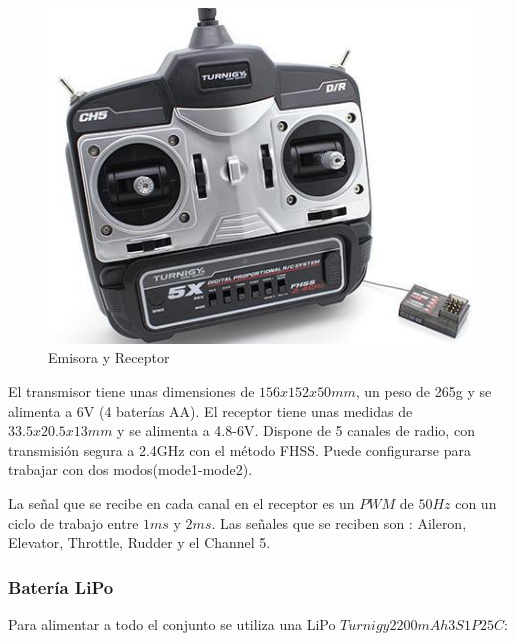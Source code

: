 \documentclass[twoside,11pt]{book}
\begin{document}
\begin{figure}[h!]
\begin{center}
\includegraphics[scale=0.4,bb=0 0 400 354]{images/E_R.png} 
\caption{Emisora y Receptor}
\end{center}
\end{figure}

El transmisor tiene unas dimensiones de $156x152x50mm$, un peso de 265g y se alimenta a 6V (4 baterías AA). El receptor tiene unas medidas de $33.5x20.5x13mm$ y se alimenta a 4.8-6V. Dispone de 5 canales de radio, con transmisión segura a 2.4GHz con el método FHSS. Puede configurarse para trabajar con dos modos(mode1-mode2).

La señal que se recibe en cada canal en el receptor es un $PWM$ de $50Hz$ con un ciclo de trabajo entre $1ms$ y $2ms$. Las señales que se reciben son  : Aileron, Elevator, Throttle, Rudder y el Channel 5. 



\subsubsection*{Batería LiPo}
Para alimentar a todo el conjunto se utiliza una LiPo $Turnigy 2200mAh 3S1P 25C$: 
\end{document}
